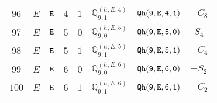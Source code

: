\documentclass[fleqn,8pt]{jsarticle}
\begin{document}
\begin{table}[ht!]
\begin{center}
\begin{tabular}{cccccccc}
$ 96 $ & $ E $ & $ {\tt E} $ & $ 4 $ & $ 1 $ & $ \mathbb{Q}_{9,1}^{(h,E,4)} $ & $ {\tt Qh(9,E,4,1)} $ & $ - C_{8} $ \\
$ 97 $ & $ E $ & $ {\tt E} $ & $ 5 $ & $ 0 $ & $ \mathbb{Q}_{9,0}^{(h,E,5)} $ & $ {\tt Qh(9,E,5,0)} $ & $ S_{4} $ \\
$ 98 $ & $ E $ & $ {\tt E} $ & $ 5 $ & $ 1 $ & $ \mathbb{Q}_{9,1}^{(h,E,5)} $ & $ {\tt Qh(9,E,5,1)} $ & $ - C_{4} $ \\
$ 99 $ & $ E $ & $ {\tt E} $ & $ 6 $ & $ 0 $ & $ \mathbb{Q}_{9,0}^{(h,E,6)} $ & $ {\tt Qh(9,E,6,0)} $ & $ - S_{2} $ \\
$ 100 $ & $ E $ & $ {\tt E} $ & $ 6 $ & $ 1 $ & $ \mathbb{Q}_{9,1}^{(h,E,6)} $ & $ {\tt Qh(9,E,6,1)} $ & $ - C_{2} $ \\
 \hline \hline
\end{tabular}
\end{center}
\end{table}
\end{document}
